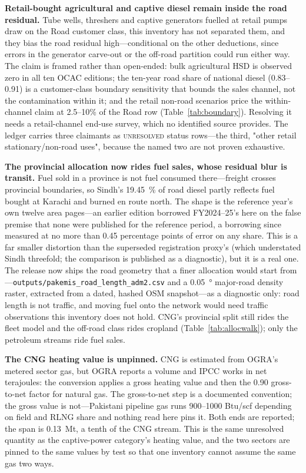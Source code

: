 \textbf{Retail-bought agricultural and captive diesel remain inside the road residual.}
Tube wells, threshers and captive generators fuelled at retail pumps draw on the Road
customer class, this inventory has not separated them, and they bias the road residual
high---conditional on the other deductions, since errors in the generator carve-out or
the off-road partition could run either way. The claim is framed rather than open-ended:
bulk agricultural HSD is observed zero in all ten OCAC editions; the ten-year road
share of national diesel (0.83--0.91) is a customer-class boundary sensitivity that
bounds the sales channel, not the contamination within it; and the retail non-road
scenarios price the within-channel claim at 2.5--10\% of the Road row
(Table~\ref{tab:boundary}). Resolving it needs a retail-channel end-use survey, which no
identified source provides. The ledger carries three claimants as \textsc{unresolved}
status rows---the third, "other retail stationary/non-road uses", because the named two
are not proven exhaustive.

\textbf{The provincial allocation now rides fuel sales, whose residual blur is transit.}
Fuel sold in a province is not fuel consumed there---freight crosses provincial
boundaries, so Sindh's \SI{19.45}{\percent} of road diesel partly reflects fuel bought at
Karachi and burned en route north. The shape is the reference year's own twelve area
pages---an earlier edition borrowed FY2024--25's here on the false premise that none were
published for the reference period, a borrowing since measured at no more than \num{0.45}
percentage points of error on any share. This is a far smaller distortion than the superseded
registration proxy's (which understated Sindh threefold; the comparison is published as a
diagnostic), but it is a real one. The release now ships the road geometry that a finer
allocation would start from---\texttt{outputs/pakemis\_road\_length\_adm2.csv} and a
\SI{0.05}{\degree} major-road density raster, extracted from a dated, hashed OSM
snapshot---as a diagnostic only: road length is not traffic, and moving fuel onto the
network would need traffic observations this inventory does not hold. CNG's provincial split still rides the fleet
model and the off-road class rides cropland (Table~\ref{tab:allocwalk}); only the
petroleum streams ride fuel sales.

\textbf{The CNG heating value is unpinned.} CNG is estimated from OGRA's metered sector
gas, but OGRA reports a volume and IPCC works in net terajoules: the conversion applies a
gross heating value and then the \num{0.90} gross-to-net factor for natural gas. The
gross-to-net step is a documented convention; the gross value is not---Pakistani pipeline gas
runs \SIrange{900}{1000}{} Btu/scf depending on field and RLNG share and nothing read here
pins it. Both ends are reported; the span is \SI{0.13}{\mega\tonne}, a tenth of the CNG
stream. This is the same unresolved quantity as the captive-power category's heating value,
and the two sectors are pinned to the same values by test so that one inventory cannot
assume the same gas two ways.

